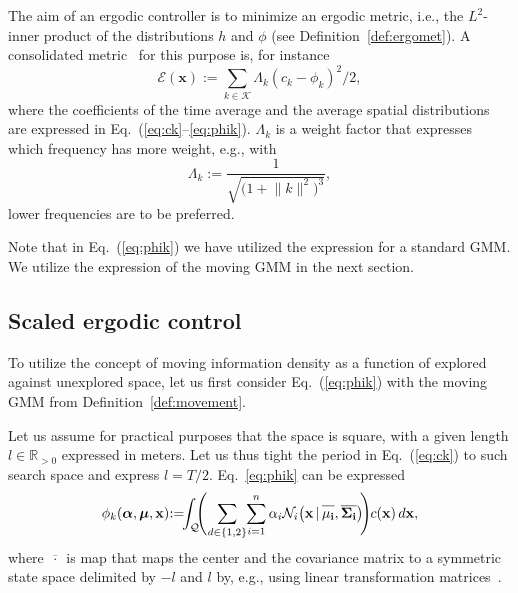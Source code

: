 \documentclass[letterpaper,10pt,conference,twoside]{IEEEtran}
\theoremstyle{definition}
\begin{document}
The aim of an ergodic controller is to minimize an ergodic metric, i.e., the $L^2$-inner product of the distributions $h$ and $\phi$ (see Definition~\ref{def:ergomet}). A consolidated metric~\cite{abraham2017ergodic,abraham2021ergodic,seewald2024energy,lerch2023safety,abraham2018decentralized,dong2023time} for this purpose is, for instance
\begin{equation}
  \mathcal{E}(\mathbf{x}):=\sum_{k\in\mathcal{K}}{\Lambda_k(c_k-\phi_k)^2/2},
\end{equation}
where the coefficients of the time average and the average spatial distributions are expressed in Eq.~(\ref{eq:ck}--\ref{eq:phik}). $\Lambda_k$ is a weight factor that expresses which frequency has more weight, e.g., with %
\begin{equation}
  \Lambda_k:=\frac{1}{\sqrt{\big(1+\lVert{k}\rVert^2\big)^3}},
\end{equation}
lower frequencies are to be preferred.

Note that in Eq.~(\ref{eq:phik}) we have utilized the expression for a standard GMM. %
We utilize the expression of the moving GMM in the next section.

\subsection{Scaled ergodic control}
\label{sec:sol}
\noindent
To utilize the concept of moving information density as a function of explored against unexplored space, let us first consider Eq.~(\ref{eq:phik}) with the moving GMM from Definition~\ref{def:movement}.

Let us assume for practical purposes that the space is square, with a given length $l\in\mathbb{R}_{>0}$ expressed in meters.
Let us thus tight the period in Eq.~(\ref{eq:ck}) to such search space and express $l=T/2$. Eq.~\ref{eq:phik} can be expressed
\begin{equation}
  \phi_k(\boldsymbol{\alpha},\boldsymbol{\mu},\mathbf{x})\hspace*{-.6ex}:=\hspace*{-1ex}\int_{\mathcal{Q}}{\hspace*{-1ex}\Bigg(\hspace*{-.3ex}\sum_{d\in\{1,2\}}\hspace*{-.5ex}\sum_{i=1}^n\alpha_i\mathcal{N}_i\big(\mathbf{x\,|\,\overline{\rule{0pt}{2.4mm}{\mu_i}},\overline{\Sigma_i}}\big)\hspace*{-.5ex}\Bigg)\hspace*{-.1ex}c(\mathbf{x})\,d\mathbf{x}},
\end{equation}
where $\overline{\,\cdot\,}$ is map that maps the center and the covariance matrix to a symmetric state space delimited by $-l$ and $l$ by, e.g., using linear transformation matrices~\cite{calinon2020mixture}.
\end{document}
